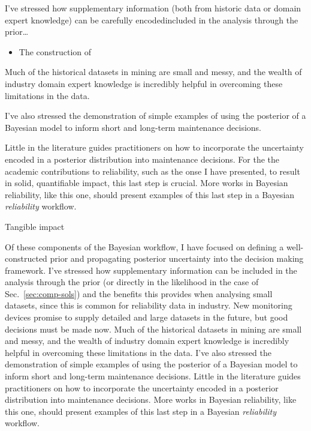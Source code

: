 I've stressed how supplementary information (both from historic data or domain expert knowledge) can be carefully encodedincluded in the analysis through the prior\dots
\begin{itemize}
  \item The construction of 
\end{itemize}
Much of the historical datasets in mining are small and messy, and the wealth of industry domain expert knowledge is incredibly helpful in overcoming these limitations in the data.

I've also stressed the demonstration of simple examples of using the posterior of a Bayesian model to inform short and long-term maintenance decisions.

Little in the literature guides practitioners on how to incorporate the uncertainty encoded in a posterior distribution into maintenance decisions.
For the the academic contributions to reliability, such as the onse I have presented, to result in solid, quantifiable impact, this last step is crucial.
More works in Bayesian reliability, like this one, should present examples of this last step in a Bayesian \textit{reliability} workflow.

Tangible impact

Of these components of the Bayesian workflow, I have focused on defining a well-constructed prior and propagating posterior uncertainty into the decision making framework. I've stressed how supplementary information can be included in the analysis through the prior (or directly in the likelihood in the case of Sec.~\ref{sec:comp-sols}) and the benefits this provides when analysing small datasets, since this is common for reliability data in industry. New monitoring devices promise to supply detailed and large datasets in the future, but good decisions must be made now. Much of the historical datasets in mining are small and messy, and the wealth of industry domain expert knowledge is incredibly helpful in overcoming these limitations in the data. I've also stressed the demonstration of simple examples of using the posterior of a Bayesian model to inform short and long-term maintenance decisions. Little in the literature guides practitioners on how to incorporate the uncertainty encoded in a posterior distribution into maintenance decisions. More works in Bayesian reliability, like this one, should present examples of this last step in a Bayesian \textit{reliability} workflow.


